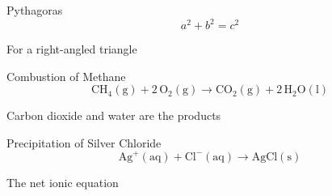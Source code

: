 \documentclass[aspectratio=169]{beamer}
\begin{document}
\begin{frame}{Pythagoras}
\centering
\label{eq029}{\Huge \[ a^2 + b^2 = c^2 \]}
\vspace{0.6em}

{\small For a right-angled triangle}
\end{frame}
\begin{frame}{Combustion of Methane}
\centering
\label{eq030}{\huge \[ \mathrm{CH_4(g)} + 2\,\mathrm{O_2(g)} \longrightarrow \mathrm{CO_2(g)} + 2\,\mathrm{H_2O(l)} \]}
\vspace{0.6em}

{\small Carbon dioxide and water are the products}
\end{frame}
\begin{frame}{Precipitation of Silver Chloride}
\centering
\label{eq031}{\Huge \[ \mathrm{Ag^+(aq)} + \mathrm{Cl^-(aq)} \longrightarrow \mathrm{AgCl(s)} \]}
\vspace{0.6em}

{\small The net ionic equation}
\end{frame}
\end{document}
